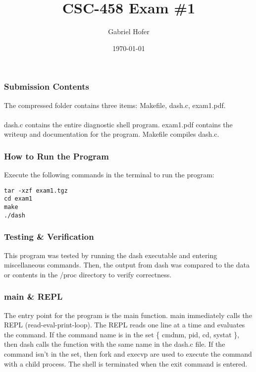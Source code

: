 \documentclass[12pt]{article}
\begin{document}
\title{CSC-458 Exam \#1}
\author{Gabriel Hofer}
\date{\today}
\maketitle
\noindent \subsubsection*{Submission Contents} 
\noindent The compressed folder contains three items: {\ttfamily Makefile}, {\ttfamily dash.c}, {\ttfamily exam1.pdf}. \\ \\ {\ttfamily dash.c} contains the entire diagnostic shell program. {\ttfamily exam1.pdf} contains the writeup and documentation for the program. {\ttfamily Makefile} compiles {\ttfamily dash.c}. 

\noindent \subsubsection*{How to Run the Program} \par
Execute the following commands in the terminal to run the program: 
\begin{verbatim}
tar -xzf exam1.tgz
cd exam1
make 
./dash
\end{verbatim}

\noindent \subsubsection*{Testing \& Verification} \par
This program was tested by running the {\ttfamily dash} executable and entering miscellaneous commands. Then, the output from {\ttfamily dash} was compared to the data or contents in the {\ttfamily /proc} directory to verify correctness.

\noindent \subsubsection*{main \& REPL} \par
The entry point for the program is the {\ttfamily main} function. {\ttfamily main} immediately calls the REPL (read-eval-print-loop). The REPL reads one line at a time and evaluates the command. If the command name is in the set \{ {\ttfamily cmdnm}, {\ttfamily pid}, {\ttfamily cd}, {\ttfamily systat} \}, then dash calls the function with the same name in the dash.c file. If the command isn't in the set, then {\ttfamily fork} and {\ttfamily execvp} are used to execute the command with a child process. The shell is terminated when the {\ttfamily exit} command is entered.
\end{document}
